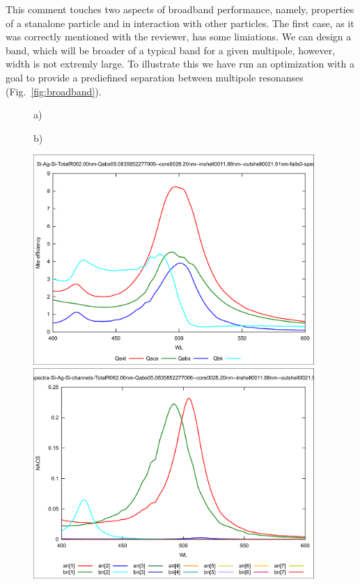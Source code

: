 \documentclass[a4paper]{article}
\begin{document}
This comment touches two aspects of broadband performance, namely,
properties of a stanalone particle and in interaction with other
particles.  The first case, as it was correctly mentioned with the
reviewer, has some limiations.  We can design a band, which will be
broader of a typical band for a given multipole, however, width is
not extremly large.  To illustrate this we have run an optimization
with a goal to provide a prediefined separation between multipole
resonanses (Fig.~\ref{fig:broadband}).
\begin{figure}
  \begin{minipage}[h]{0.49\textwidth}    \begin{flushleft}     a)    \end{flushleft}
  \end{minipage}
  \begin{minipage}[h]{0.49\textwidth}    \begin{flushleft}     b)    \end{flushleft}
  \end{minipage}
  \begin{minipage}[h]{0.49\textwidth} 
   \includegraphics[width=0.95\textwidth]{band20-em}
  \end{minipage}
  \begin{minipage}[h]{0.49\textwidth} 
   \includegraphics[width=0.95\textwidth]{band20-em-ch}

\end{minipage}
\end{figure}
\end{document}
